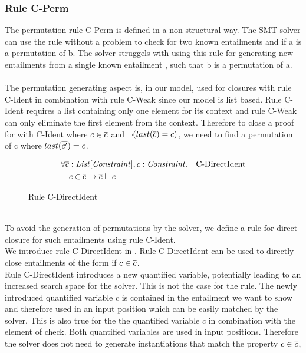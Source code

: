 \subsubsection{Rule C-Perm}
The permutation rule C-Perm is defined in a
non-structural way.
The SMT solver can use the rule without a problem to check for
two known entailments  and 
if \ovl a is a permutation of \ovl b.
The solver struggels with using this rule
for generating new entailments 
from a single known entailment ,
such that \ovl b is a permutation of \ovl a.\\
\\
The permutation generating aspect is, in our model,
used for closures with rule C-Ident in combination with rule C-Weak
since our model is list based.
Rule C-Ident requires a list containing only one
element for its context and rule C-Weak can only
eliminate the first element from the context.
Therefore to close a proof for  with C-Ident
where $c \in \overline{c}$ and $\neg (last(\overline{c}) = c)$,
we need to find a permutation  of \ovl c
where $last(\overline{c'}) = c$.
%
\begin{figure}[h]
\begin{align*}
&\forall \overline{c}: \mathit{List[\mathit{Constraint}]}, c: \mathit{Constraint}. && \text{C-DirectIdent}\\
&\quad c \in \overline{c} \rightarrow \overline{c} \vdash c
\end{align*}
\caption{Rule C-DirectIdent}
\label{fig:axioms-cdirectident}
\end{figure}\\
%
To avoid the generation of permutations by the solver,
we define a rule for direct closure for such entailments
using rule C-Ident.\\
We introduce rule C-DirectIdent in .
Rule C-DirectIdent can be used to directly close entailments
of the form  if $c \in \overline{c}$.\\
Rule C-DirectIdent introduces a new quantified variable,
potentially leading to an increased search space for the solver.
This is not the case for the rule.
The newly introduced quantified variable \ovl c
is contained in the entailment we want to show
and therefore used in an input position
which can be easily matched by the solver.
This is also true for the the quantified variable $c$
in combination with the element of check.
Both quantified variables are used in input positions.
Therefore the solver does not need to generate
instantiations that match the property $c \in \overline{c}$,
